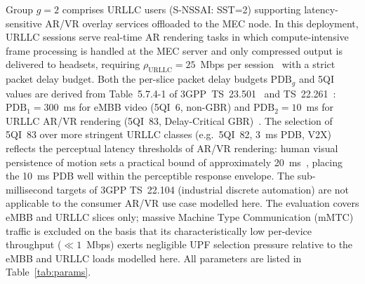 \documentclass[conference]{IEEEtran}
\begin{document}
Group $g=2$ comprises URLLC users (S-NSSAI: SST=2)
supporting latency-sensitive AR/VR overlay services
offloaded to the MEC node. In this deployment, URLLC
sessions serve real-time AR rendering tasks in which
compute-intensive frame processing is handled at the
MEC server and only compressed output is delivered
to headsets, requiring $\rho_\text{URLLC} = 25$~Mbps
per session~\cite{yaqoob2020survey_360video} with a
strict packet delay budget. Both the per-slice
packet delay budgets $\text{PDB}_g$ and 5QI values
are derived from Table~5.7.4-1 of
3GPP~TS~23.501~\cite{3gpp_ts23501} and
TS~22.261~\cite{3gpp_ts22261}: $\text{PDB}_1 = 300$~ms
for eMBB video (5QI~6, non-GBR) and
$\text{PDB}_2 = 10$~ms for URLLC AR/VR rendering
(5QI~83, Delay-Critical GBR)~\cite{3gpp_ts22261}.
The selection of 5QI~83 over more stringent URLLC classes
(e.g.\ 5QI~82, 3~ms PDB, V2X) reflects the perceptual
latency thresholds of AR/VR rendering: human visual
persistence of motion sets a practical bound of
approximately 20~ms~\cite{yaqoob2020survey_360video},
placing the 10~ms PDB well within the perceptible
response envelope. The sub-millisecond targets of
3GPP TS~22.104 (industrial discrete automation) are
not applicable to the consumer AR/VR use case modelled here.
The evaluation covers eMBB and URLLC slices only;
massive Machine Type Communication (mMTC) traffic is excluded
on the basis that its characteristically low per-device
throughput ($\ll 1$~Mbps) exerts negligible UPF selection
pressure relative to the eMBB and URLLC loads modelled here.
All parameters are listed in Table~\ref{tab:params}.
\end{document}
